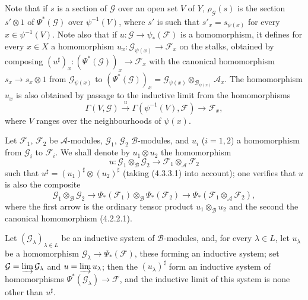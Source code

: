 \begin{env}[4.4.3]
Note that if $s$ is a section of $\mathcal{G}$ over an open set
$V$ of $Y$, $\rho_{\mathcal{G}}(s)$ is the section $s'\otimes1$ of
$\Psi^*(\mathcal{G})$ over $\psi^{-1}(V)$, where $s'$ is such that
$s'_x=s_{\psi(x)}$ for every $x\in\psi^{-1}(V)$. Note also that if
$u:\mathcal{G}\to\psi_*(\mathcal{F})$ is a homomorphism, it defines for
every $x\in X$ a homomorphism
$u_x:\mathcal{G}_{\psi(x)}\to\mathcal{F}_x$ on the stalks, obtained by
composing
$(u^\sharp)_x:(\Psi^*(\mathcal{G}))_x\to\mathcal{F}_x$ with the canonical
homomorphism $s_x\to s_x\otimes1$ from $\mathcal{G}_{\psi(x)}$ to
$(\Psi^*(\mathcal{G}))_x
=\mathcal{G}_{\psi(x)}\otimes_{\mathcal{B}_{\psi(x)}}\mathcal{A}_x$.
The homomorphism $u_x$ is also obtained by passage to the inductive limit
from the homomorphisms
\[
  \Gamma(V,\mathcal{G})\xrightarrow{u}
  \Gamma(\psi^{-1}(V),\mathcal{F})\longrightarrow\mathcal{F}_x,
\]
where $V$ ranges over the neighbourhoods of $\psi(x)$.
\end{env}

\begin{env}[4.4.4]
\label{0.4.4.4}
Let $\mathcal{F}_1$, $\mathcal{F}_2$ be $\mathcal{A}$-modules,
$\mathcal{G}_1$, $\mathcal{G}_2$ $\mathcal{B}$-modules, and $u_i$ ($i=1,2$)
a homomorphism from $\mathcal{G}_i$ to $\mathcal{F}_i$. We shall denote by
$u_1\otimes u_2$ the homomorphism
\[
  u:\mathcal{G}_1\otimes_{\mathcal{B}}\mathcal{G}_2
  \longrightarrow
  \mathcal{F}_1\otimes_{\mathcal{A}}\mathcal{F}_2
\]
such that $u^\sharp=(u_1)^\sharp\otimes(u_2)^\sharp$ (taking
(4.3.3.1) into account); one verifies that $u$ is also the composite
\[
  \mathcal{G}_1\otimes_{\mathcal{B}}\mathcal{G}_2
  \longrightarrow
  \Psi_*(\mathcal{F}_1)\otimes_{\mathcal{B}}\Psi_*(\mathcal{F}_2)
  \longrightarrow
  \Psi_*(\mathcal{F}_1\otimes_{\mathcal{A}}\mathcal{F}_2),
\]
where the first arrow is the ordinary tensor product
$u_1\otimes_{\mathcal{B}}u_2$ and the second the canonical homomorphism
(4.2.2.1).
\end{env}

\begin{env}[4.4.5]
\label{0.4.4.5}
Let $(\mathcal{G}_\lambda)_{\lambda\in L}$ be an inductive system of
$\mathcal{B}$-modules, and, for every $\lambda\in L$, let $u_\lambda$ be a
homomorphism $\mathcal{G}_\lambda\to\Psi_*(\mathcal{F})$, these forming an
inductive system; set
$\mathcal{G}=\varinjlim\mathcal{G}_\lambda$ and
$u=\varinjlim u_\lambda$; then the $(u_\lambda)^\sharp$ form an
inductive system of homomorphisms $\Psi^*(\mathcal{G}_\lambda)\to\mathcal{F}$, and the
inductive limit of this system is none other than $u^\sharp$.
\end{env}

